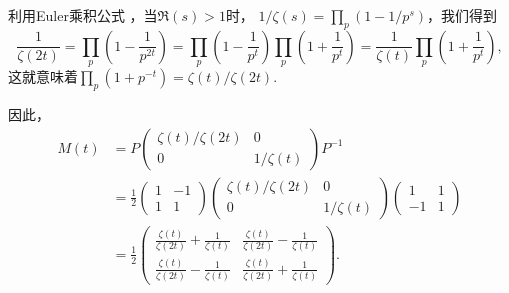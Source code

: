 \begin{solution}
  利用Euler乘积公式 \cite[p.272]{61}，当$\Re(s)>1$时，
  $1/\zeta(s)=\prod_p(1-1/p^s)$，我们得到
  \[
    \frac1{\zeta(2t)} = \prod_p\left( 1 - \frac1{p^{2t}} \right) = \prod_p\left( 1 - \frac1{p^t} \right) \prod_p \left( 1 + \frac1{p^t} \right) = \frac1{\zeta(t)}\prod_p \left( 1 + \frac1{p^t} \right),
  \]
  这就意味着$\prod_p(1+p^{-t})=\zeta(t)/\zeta(2t)$.

  因此，
  \begin{align*}
    M(t) & = P \begin{pmatrix}
      \zeta(t)/\zeta(2t) & 0 \\
      0 & 1/\zeta(t)
    \end{pmatrix}P^{-1} \\
    & = \frac12 \begin{pmatrix}
      1 & -1 \\
      1 & 1
    \end{pmatrix} \begin{pmatrix}
      \zeta(t)/\zeta(2t) & 0 \\
      0 & 1/\zeta(t)
    \end{pmatrix}
    \begin{pmatrix}
      1 & 1 \\
      -1 & 1
    \end{pmatrix} \\
    & = \frac12 \begin{pmatrix}
      \frac{\zeta(t)}{\zeta(2t)} + \frac1{\zeta(t)} & \frac{\zeta(t)}{\zeta(2t)} - \frac1{\zeta(t)} \\
      \frac{\zeta(t)}{\zeta(2t)} - \frac1{\zeta(t)} & \frac{\zeta(t)}{\zeta(2t)} + \frac1{\zeta(t)}
    \end{pmatrix}.
  \end{align*}
\end{solution}

